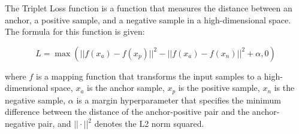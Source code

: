 The Triplet Loss function is a function that measures the distance between an anchor, a positive sample, and a negative sample in a high-dimensional space. The formula for this function is given:

$$L = \max( ||f(x_{a}) - f(x_{p})||^{2} - ||f(x_{a}) - f(x_{n})||^{2} + \alpha, 0 )$$

where $f$ is a mapping function that transforms the input samples to a high-dimensional space, $x_{a}$ is the anchor sample, $x_{p}$ is the positive sample, $x_{n}$ is the negative sample, $\alpha$ is a margin hyperparameter that specifies the minimum difference between the distance of the anchor-positive pair and the anchor-negative pair, and $||\cdot||^{2}$ denotes the L2 norm squared.